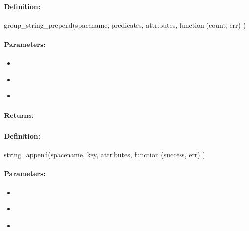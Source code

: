 \paragraph{Definition:}
\begin{javascriptcode}
group_string_prepend(spacename, predicates, attributes, function (count, err) {})
\end{javascriptcode}
\paragraph{Parameters:}
\begin{itemize}[noitemsep]
\item {}\\

\item {}\\

\item {}\\

\end{itemize}

\paragraph{Returns:}


\pagebreak
\subsubsection{}
\label{api:nodejs:string_append}


\paragraph{Definition:}
\begin{javascriptcode}
string_append(spacename, key, attributes, function (success, err) {})
\end{javascriptcode}
\paragraph{Parameters:}
\begin{itemize}[noitemsep]
\item {}\\

\item {}\\

\item {}\\

\end{itemize}

